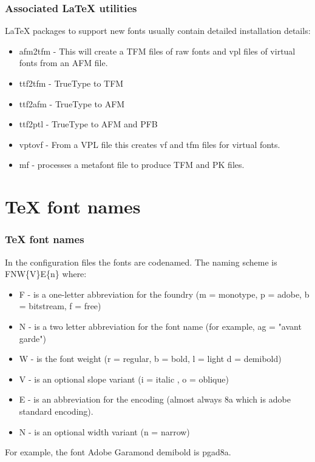\documentclass{beamer}
\begin{document}
\begin{frame}[fragile]
\frametitle{Associated \LaTeX{} utilities}
\vspace{-0.3cm}
\footnotesize{\LaTeX{} packages to support new fonts usually contain detailed installation details:}\\
\begin{itemize}
\item \tiny{afm2tfm} - \scriptsize{This will create a TFM files of raw fonts and vpl files of virtual fonts from an AFM file.}
\item \tiny{ttf2tfm} - \scriptsize{TrueType to TFM}
\item \tiny{ttf2afm} - \scriptsize{TrueType to AFM}
\item \tiny{ttf2ptl} - \scriptsize{TrueType to AFM and PFB}
\item \tiny{vptovf} - \scriptsize{From a} \tiny{VPL} \scriptsize{file this creates vf and tfm files for virtual fonts.}
\item \tiny{mf} - \scriptsize{processes a metafont file to produce TFM and PK files.}
\end{itemize}
\end{frame}

\section{\TeX{} font names}

\begin{frame}[fragile]
\frametitle{\TeX{} font names}
\vspace{-0.3cm}
\footnotesize{In the configuration files the fonts are codenamed. The naming scheme is} \tiny{ FNW\{V\}E\{n\}}\footnotesize{ where:}\\
\begin{itemize}
\item \tiny{F} - \scriptsize{is a one-letter abbreviation for the foundry (m = monotype, p = adobe, b = bitstream, f = free)}
\item \tiny{N} - \scriptsize{is a two letter abbreviation for the font name (for example, ag = "avant garde")}
\item \tiny{W} - \scriptsize{is the font weight (r = regular, b = bold, l = light d = demibold)}
\item \tiny{V} - \scriptsize{is an optional slope variant (i = italic , o = oblique)}
\item \tiny{E} - \scriptsize{is an abbreviation for the encoding (almost always 8a which is adobe standard encoding).}
\item \tiny{N} - \scriptsize{ is an optional width variant (n = narrow)}
\end{itemize}
\footnotesize{For example, the font Adobe Garamond demibold is}\tiny{ pgad8a.}  
\end{frame}
\end{document}
